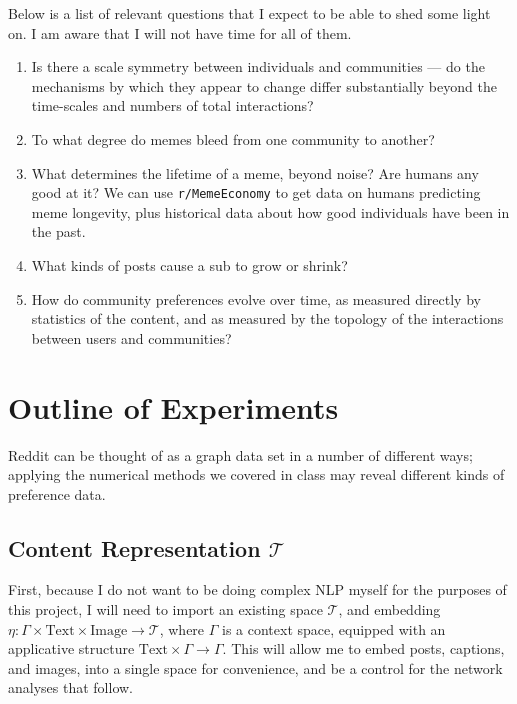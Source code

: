 \documentclass{amsart}
\begin{document}
	
	Below is a list of relevant questions that I expect to be able to shed some light on. I am aware that I will not have time for all of them.
	\begin{enumerate}
		\item Is there a scale symmetry between individuals and communities --- do the mechanisms by which they appear to change differ substantially beyond the time-scales and numbers of total interactions?
		
		\item To what degree do memes bleed from one community to another?
		\item What determines the lifetime of a meme, beyond noise? Are humans any good at it? We can use \texttt{r/MemeEconomy} to get data on humans predicting meme longevity, plus historical data about how good individuals have been in the past.
		
		\item What kinds of posts cause a sub to grow or shrink? 
		
		\item How do community preferences evolve over time, as measured directly by statistics of the content, and as measured by the topology of the interactions between users and communities?
	\end{enumerate}

	



	

	\section{Outline of Experiments}
	Reddit can be thought of as a graph data set in a number of different ways; applying the numerical methods we covered in class may reveal different kinds of preference data.

	\subsection{Content Representation $\mathcal T$}
		
	First, because I do not want to be doing complex NLP myself for the purposes of this project, I will need to import an existing space $\mathcal T$, and embedding $\eta: \Gamma \times \mathrm{Text} \times \mathrm{Image} \to \mathcal T$, where $\Gamma$ is a context space, equipped with an applicative structure $\mathrm{Text} \times \Gamma \to \Gamma$. This will allow me to embed posts, captions, and images, into a single space for convenience, and be a control for the network analyses that follow.
	
\end{document}
